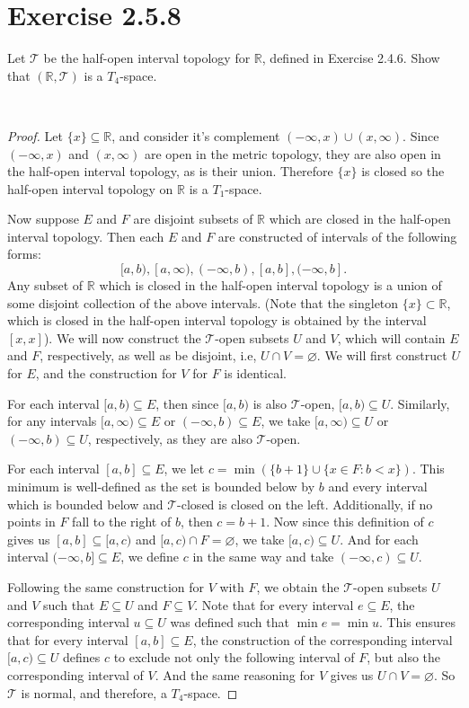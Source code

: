 \documentclass[12pt]{article}
\newenvironment{problem}
    {\begin{lrbox}{\mybox}\begin{minipage}{\textwidth-10pt}}
    {\end{minipage}\end{lrbox}\framebox[6.5in]{\usebox{\mybox}}\\}
\newcommand{\R}{\mathbb{R}}
\let\emptyset\varnothing
\newcommand{\T}{\mathscr{T}}
\begin{document}
\section*{Exercise 2.5.8}
\begin{problem}
    Let $\T$ be the half-open interval topology for $\R$, defined in Exercise 2.4.6. Show that $(\R,\T)$ is a $T_4$-space.
\end{problem}

\begin{proof}
    Let $\{x\}\subseteq\R$, and consider it's complement $(-\infty,x)\cup(x,\infty)$. Since $(-\infty,x)$ and $(x,\infty)$ are open in the metric topology, they are also open in the half-open interval topology, as is their union. Therefore $\{x\}$ is closed so the half-open interval topology on $\R$ is a $T_1$-space.
    
    Now suppose $E$ and $F$ are disjoint subsets of $\R$ which are closed in the half-open interval topology. Then each $E$ and $F$ are constructed of intervals of the following forms:
    \[[a,b), [a,\infty), (-\infty,b), [a,b], (-\infty,b].\]
    Any subset of $\R$ which is closed in the half-open interval topology is a union of some disjoint collection of the above intervals. (Note that the singleton $\{x\}\subset\R$, which is closed in the half-open interval topology is obtained by the interval $[x,x]$). We will now construct the $\T$-open subsets $U$ and $V$, which will contain $E$ and $F$, respectively, as well as be disjoint, i.e, $U\cap V=\emptyset$. We will first construct $U$ for $E$, and the construction for $V$ for $F$ is identical.
    
    For each interval $[a,b)\subseteq E$, then since $[a,b)$ is also $\T$-open, $[a,b)\subseteq U$. Similarly, for any intervals $[a,\infty)\subseteq E$ or $(-\infty, b)\subseteq E$, we take $[a,\infty)\subseteq U$ or $(-\infty, b)\subseteq U$, respectively, as they are also $\T$-open. 
    
    For each interval $[a,b]\subseteq E$, we let $c=\min(\{b+1\}\cup\{x\in F : b<x\})$. This minimum is well-defined as the set is bounded below by $b$ and every interval which is bounded below and $\T$-closed is closed on the left. Additionally, if no points in $F$ fall to the right of $b$, then $c=b+1$. Now since this definition of $c$ gives us $[a,b]\subseteq[a,c)$ and $[a,c)\cap F=\emptyset$, we take $[a,c)\subseteq U$. And for each interval $(-\infty,b]\subseteq E$, we define $c$ in the same way and take $(-\infty,c)\subseteq U$.
    
    Following the same construction for $V$ with $F$, we obtain the $\T$-open subsets $U$ and $V$ such that $E\subseteq U$ and $F\subseteq V$. Note that for every interval $e\subseteq E$, the corresponding interval $u\subseteq U$ was defined such that $\min e = \min u$. This ensures that for every interval $[a,b]\subseteq E$, the construction of the corresponding interval $[a,c)\subseteq U$ defines $c$ to exclude not only the following interval of $F$, but also the corresponding interval of $V$. And the same reasoning for $V$ gives us $U\cap V = \emptyset$. So $\T$ is normal, and therefore, a $T_4$-space.
    
\end{proof}
\end{document}
